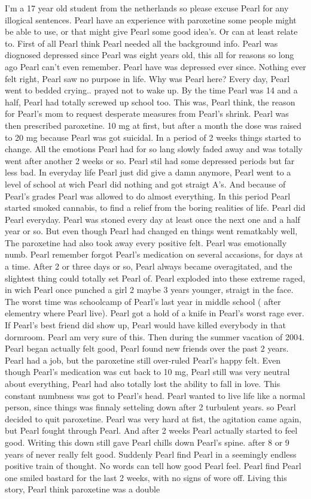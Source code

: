 \documentclass[12pt]{book}
\begin{document}
I'm a 17 year old student from the netherlands so please excuse Pearl for any illogical sentences. Pearl have an experience with paroxetine some people might be able to use, or that might give Pearl some good idea's. Or can at least relate to. First of all Pearl think Pearl needed all the background info. Pearl was diognosed depressed since Pearl was eight years old, this all for reasons so long ago Pearl can't even remember. Pearl have was depressed ever since. Nothing ever felt right, Pearl saw no purpose in life. Why was Pearl here? Every day, Pearl went to bedded crying.. prayed not to wake up. By the time Pearl was 14 and a half, Pearl had totally screwed up school too. This was, Pearl think, the reason for Pearl's mom to request desperate measures from Pearl's shrink. Pearl was then prescribed paroxetine. 10 mg at first, but after a month the dose was raised to 20 mg because Pearl was got suicidal. In a period of 2 weeks things started to change. All the emotions Pearl had for so lang slowly faded away and was totally went after another 2 weeks or so. Pearl stil had some depressed periods but far less bad. In everyday life Pearl just did give a damn anymore, Pearl went to a level of school at wich Pearl did nothing and got straigt A's. And because of Pearl's grades Pearl was allowed to do almost everything. In this period Pearl started smoked cannabis, to find a relief from the boring realities of life. Pearl did Pearl everyday. Pearl was stoned every day at least once the next one and a half year or so. But even though Pearl had changed en things went rematkably well, The paroxetine had also took away every positive felt. Pearl was emotionally numb. Pearl remember forgot Pearl's medication on several accasions, for days at a time. After 2 or three days or so, Pearl always became overagitated, and the slightest thing could totally set Pearl of. Pearl exploded into these extreme raged, in wich Pearl once punched a girl 2 maybe 3 years younger, straigt in the face. The worst time was schoolcamp of Pearl's last year in middle school ( after elementry where Pearl live). Pearl got a hold of a knife in Pearl's worst rage ever. If Pearl's best friend did show up, Pearl would have killed everybody in that dormroom. Pearl am very sure of this. Then during the summer vacation of 2004. Pearl began actually felt good, Pearl found new friends over the past 2 years. Pearl had a job, but the paroxetine still over-ruled Pearl's happy felt. Even though Pearl's medication was cut back to 10 mg, Pearl still was very neutral about everything, Pearl had also totally lost the ability to fall in love. This constant numbness was got to Pearl's head. Pearl wanted to live life like a normal person, since things was finnaly setteling down after 2 turbulent years. so Pearl decided to quit paroxetine. Pearl was very hard at fist, the agitation came again, but Pearl fought through Pearl. And after 2 weeks Pearl actually started to feel good. Writing this down still gave Pearl chills down Pearl's spine. after 8 or 9 years of never really felt good. Suddenly Pearl find Pearl in a seemingly endless positive train of thought. No words can tell how good Pearl feel. Pearl find Pearl one smiled bastard for the last 2 weeks, with no signs of wore off. Living this story, Pearl think paroxetine was a double 
\end{document}

